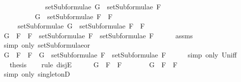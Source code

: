 \begin{isabellebody}
\ \ \ \ \ \ \ \ \ \ \ \ {\isasymLongrightarrow}\ setSubformulae\ G\ {\isasymsubseteq}\ setSubformulae\ F{}{\isachardoublequoteclose}\isanewline
\ \ \ \ \ \ \ \ \ \ {\isachardoublequoteopen}G\ {\isasymin}\ setSubformulae\ {\isacharparenleft}F{}\ \isactrlbold {\isasymor}\ F{}{\isacharparenright}{\isachardoublequoteclose}\isanewline
\ \ \ \ \ {\isachardoublequoteopen}setSubformulae\ G\ {\isasymsubseteq}\ setSubformulae\ {\isacharparenleft}F{}\ \isactrlbold {\isasymor}\ F{}{\isacharparenright}{\isachardoublequoteclose}\isanewline
%
\isadelimproof
%
\endisadelimproof
%
\isatagproof
{}\isamarkupfalse%
\ {\isacharminus}\isanewline
\ \ \isamarkupfalse%
\ {\isachardoublequoteopen}G\ {\isasymin}\ {\isacharbraceleft}F{}\ \isactrlbold {\isasymor}\ F{}{\isacharbraceright}\ {\isasymunion}\ {\isacharparenleft}setSubformulae\ F{}\ {\isasymunion}\ setSubformulae\ F{}{\isacharparenright}{\isachardoublequoteclose}\isanewline
\ \ \ \ \isamarkupfalse%
\ assms{\isacharparenleft}{}{\isacharparenright}\ \isanewline
\ \ \ \ \isamarkupfalse%
\ {\isacharparenleft}simp\ only{\isacharcolon}\ setSubformulae{\isacharunderscore}or{\isacharparenright}\isanewline
\ \ \isamarkupfalse%
\ \isamarkupfalse%
\ {\isachardoublequoteopen}G\ {\isasymin}\ {\isacharbraceleft}F{}\ \isactrlbold {\isasymor}\ F{}{\isacharbraceright}\ {\isasymor}\ G\ {\isasymin}\ setSubformulae\ F{}\ {\isasymunion}\ setSubformulae\ F{}{\isachardoublequoteclose}\isanewline
\ \ \ \ \isamarkupfalse%
\ {\isacharparenleft}simp\ only{\isacharcolon}\ Un{\isacharunderscore}iff{\isacharparenright}\isanewline
\ \ \isamarkupfalse%
\ \isamarkupfalse%
\ {\isacharquery}thesis\isanewline
\ \ \isamarkupfalse%
\ {\isacharparenleft}rule\ disjE{\isacharparenright}\isanewline
\ \ \ \ \isamarkupfalse%
\ {\isachardoublequoteopen}G\ {\isasymin}\ {\isacharbraceleft}F{}\ \isactrlbold {\isasymor}\ F{}{\isacharbraceright}{\isachardoublequoteclose}\isanewline
\ \ \ \ \isamarkupfalse%
\ \isamarkupfalse%
\ {\isachardoublequoteopen}G\ {\isacharequal}\ F{}\ \isactrlbold {\isasymor}\ F{}{\isachardoublequoteclose}\isanewline
\ \ \ \ \ \ \isamarkupfalse%
\ {\isacharparenleft}simp\ only{\isacharcolon}\ singletonD{\isacharparenright}\isanewline

\end{isabellebody}
